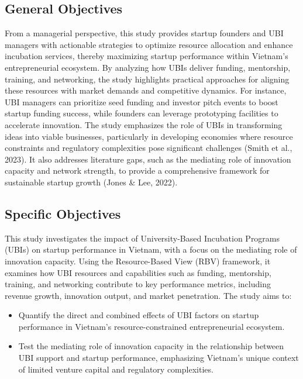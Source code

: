 \documentclass[../Main.tex]{subfiles}
\begin{document}
	\subsection{General Objectives}
	\label{subsection:1.2.1_General_objectives}
	From a managerial perspective, this study provides startup founders and UBI managers with actionable strategies to optimize resource allocation and enhance incubation services, thereby maximizing startup performance within Vietnam's entrepreneurial ecosystem. By analyzing how UBIs deliver funding, mentorship, training, and networking, the study highlights practical approaches for aligning these resources with market demands and competitive dynamics. For instance, UBI managers can prioritize seed funding and investor pitch events to boost startup funding success, while founders can leverage prototyping facilities to accelerate innovation. The study emphasizes the role of UBIs in transforming ideas into viable businesses, particularly in developing economies where resource constraints and regulatory complexities pose significant challenges (Smith et al., 2023). It also addresses literature gaps, such as the mediating role of innovation capacity and network strength, to provide a comprehensive framework for sustainable startup growth (Jones \& Lee, 2022).

	\subsection{Specific Objectives}
	\label{subsection:1.2.2_Specific_objectives}
	This study investigates the impact of University-Based Incubation Programs (UBIs) on startup performance in Vietnam, with a focus on the mediating role of innovation capacity. Using the Resource-Based View (RBV) framework, it examines how UBI resources and capabilities such as funding, mentorship, training, and networking contribute to key performance metrics, including revenue growth, innovation output, and market penetration. The study aims to:
	\begin{itemize}
		\item Quantify the direct and combined effects of UBI factors on startup performance in Vietnam's resource-constrained entrepreneurial ecosystem.
		\item Test the mediating role of innovation capacity in the relationship between UBI support and startup performance, emphasizing Vietnam's unique context of limited venture capital and regulatory complexities.
	\end{itemize}
\end{document}
